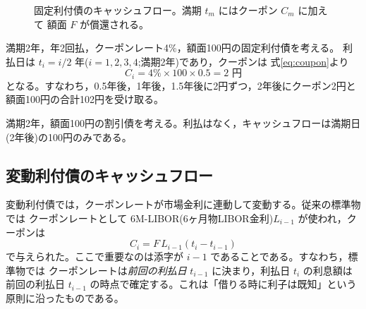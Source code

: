 \begin{figure}[htbp]
\centering
{}
\caption{固定利付債のキャッシュフロー。満期 $t_m$ にはクーポン $C_m$ に加えて
額面 $F$ が償還される。}
\label{fig:fixedbond-cf}
\end{figure}

\begin{example}[固定利付債のキャッシュフロー]
満期2年，年2回払，クーポンレート4\%，額面100円の固定利付債を考える。
利払日は $t_i = i/2$ 年($i=1,2,3,4$;満期2年)であり，クーポンは
式\eqref{eq:coupon}より
\[
C_i = 4\% \times 100 \times 0.5 = 2 \text{ 円}
\]
となる。すなわち，0.5年後，1年後，1.5年後に2円ずつ，2年後にクーポン2円と
額面100円の合計102円を受け取る。
\end{example}

\begin{example}[割引債のキャッシュフロー]
満期2年，額面100円の割引債を考える。利払はなく，キャッシュフローは満期日
(2年後)の100円のみである。
\end{example}

\vspace{18pt}

\subsection{変動利付債のキャッシュフロー}

変動利付債では，クーポンレートが市場金利に連動して変動する。従来の標準物では
クーポンレートとして 6M-LIBOR(6ヶ月物LIBOR金利)$L_{i-1}$ が使われ，クーポンは
\begin{equation}
C_i = F \, L_{i-1} (t_i - t_{i-1})
\end{equation}
で与えられた。ここで重要なのは添字が $i-1$ であることである。すなわち，標準物では
クーポンレートは\emph{前回の利払日} $t_{i-1}$ に決まり，利払日 $t_i$ の利息額は
前回の利払日 $t_{i-1}$ の時点で確定する。これは「借りる時に利子は既知」という
原則に沿ったものである。

